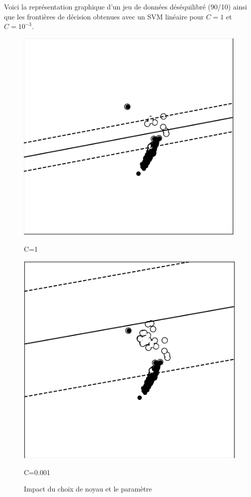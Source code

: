 \documentclass{rapport}
\begin{document}
Voici la représentation graphique d’un jeu de données déséquilibré (90/10) ainsi que les frontières de décision obtenues avec un SVM linéaire pour $C = 1$ et $C = 10^{-3}$.

\begin{figure}[H]
    \centering
    \begin{minipage}{0.47\linewidth}
        \centering
        \includegraphics[width=\linewidth]{logos/1.PNG}
        \caption*{C=1}
    \end{minipage}\hfill
    \begin{minipage}{0.47\linewidth}
        \centering
        \includegraphics[width=\linewidth]{logos/2.PNG}
        \caption*{C=0.001}
    \end{minipage}\hfill
    \caption{Impact du choix de noyau et le paramètre}
    \label{fig:trois_images}
\end{figure}
\end{document}
